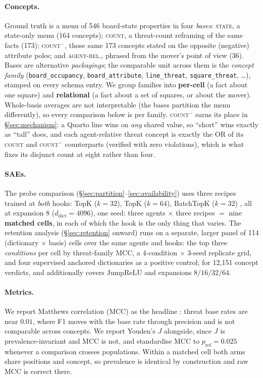 \documentclass{article}
\begin{document}
\paragraph{Concepts.} Ground truth is a menu of 546 board-state properties in
four \emph{bases}: \textsc{state}, a state-only menu (164 concepts);
\textsc{count}, a threat-count reframing of the same facts (173);
\textsc{count}$^-$, those same 173 concepts stated on the opposite (negative)
attribute poles; and \textsc{agent-rel.}, phrased from the mover's point of view
(36). Bases are alternative \emph{packagings}; the comparable unit across them
is the \emph{concept family} (\texttt{board\_occupancy}, \texttt{board\-\_attribute},
\texttt{line\_threat}, \texttt{square\_threat}, \dots), stamped on every schema
entry. We group families into \textbf{per-cell} (a fact about one square) and
\textbf{relational} (a fact about a set of squares, or about the mover).
Whole-basis averages are not interpretable (the bases partition the menu
differently), so every comparison below is per family. \textsc{count}$^-$ earns
its place in \S\ref{sec:mechanism}: a Quarto line wins on \emph{any} shared
value, so ``short'' wins exactly as ``tall'' does, and each agent-relative
threat concept is exactly the OR of its \textsc{count} and \textsc{count}$^-$
counterparts (verified with zero violations), which is what fixes its disjunct
count at eight rather than four.

\paragraph{SAEs.} The probe comparison
(\S\ref{sec:partition}--\ref{sec:availability}) uses three recipes trained at
\emph{both} hooks: TopK ($k{=}32$), TopK ($k{=}64$), BatchTopK ($k{=}32$)
\citep{gao2024scaling,bussmann2024batchtopk}, all at expansion $8$
($d_{\text{dict}}=4096$), one seed: three agents $\times$ three recipes $=$ nine
\textbf{matched cells}, in each of which the hook is the only thing that varies.
The retention analysis (\S\ref{sec:retention} onward) runs on a separate,
larger panel of 114 (dictionary $\times$ basis) cells over the same agents and
hooks: the top three \emph{conditions} per cell by threat-family MCC, a
4-condition $\times$ 3-seed replicate grid, and four supervised anchored
dictionaries as a positive control; for 12{,}151 concept verdicts, and
additionally covers JumpReLU \citep{rajamanoharan2024jumping} and expansions
$8/16/32/64$.

\paragraph{Metrics.} We report Matthews correlation (MCC) as the headline
\citep{chicco2020advantages}: threat base rates are near $0.01$, where F1 moves
with the base rate through precision and is not comparable across concepts. We
report Youden's $J$ \citep{youden1950index} alongside, since $J$ is
prevalence-invariant and MCC is not, and standardise MCC to
$p_{\text{ref}}=0.025$ whenever a comparison crosses populations. Within a
matched cell both arms share positions and concept, so prevalence is identical
by construction and raw MCC is correct there.
\end{document}
